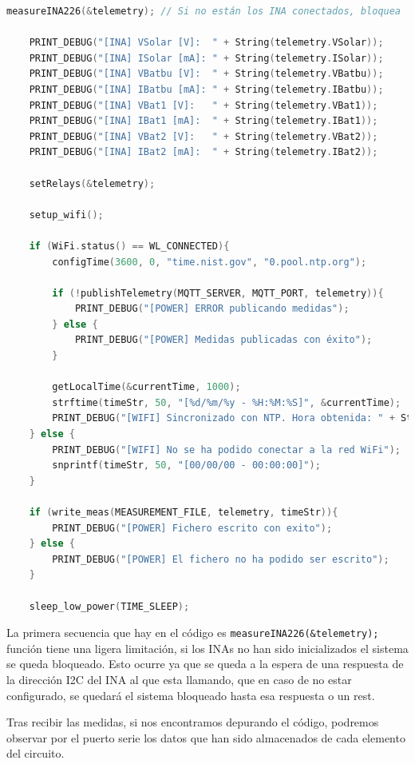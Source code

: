 \begin{lstlisting}[captionpos=b, caption={Codigo de la funcion loop}, language=c++]
    measureINA226(&telemetry); // Si no están los INA conectados, bloquea

    PRINT_DEBUG("[INA] VSolar [V]:  " + String(telemetry.VSolar));
    PRINT_DEBUG("[INA] ISolar [mA]: " + String(telemetry.ISolar));
    PRINT_DEBUG("[INA] VBatbu [V]:  " + String(telemetry.VBatbu));
    PRINT_DEBUG("[INA] IBatbu [mA]: " + String(telemetry.IBatbu));
    PRINT_DEBUG("[INA] VBat1 [V]:   " + String(telemetry.VBat1));
    PRINT_DEBUG("[INA] IBat1 [mA]:  " + String(telemetry.IBat1));
    PRINT_DEBUG("[INA] VBat2 [V]:   " + String(telemetry.VBat2));
    PRINT_DEBUG("[INA] IBat2 [mA]:  " + String(telemetry.IBat2));

    setRelays(&telemetry);

    setup_wifi();

    if (WiFi.status() == WL_CONNECTED){
        configTime(3600, 0, "time.nist.gov", "0.pool.ntp.org");
        
        if (!publishTelemetry(MQTT_SERVER, MQTT_PORT, telemetry)){
            PRINT_DEBUG("[POWER] ERROR publicando medidas");
        } else {
            PRINT_DEBUG("[POWER] Medidas publicadas con éxito");
        }

        getLocalTime(&currentTime, 1000);
        strftime(timeStr, 50, "[%d/%m/%y - %H:%M:%S]", &currentTime);
        PRINT_DEBUG("[WIFI] Sincronizado con NTP. Hora obtenida: " + String(timeStr));
    } else {
        PRINT_DEBUG("[WIFI] No se ha podido conectar a la red WiFi");
        snprintf(timeStr, 50, "[00/00/00 - 00:00:00]");
    }

    if (write_meas(MEASUREMENT_FILE, telemetry, timeStr)){
        PRINT_DEBUG("[POWER] Fichero escrito con exito");
    } else {
        PRINT_DEBUG("[POWER] El fichero no ha podido ser escrito");
    }

    sleep_low_power(TIME_SLEEP);
\end{lstlisting}

La primera secuencia que hay en el código es \texttt{measureINA226(&telemetry);} función tiene una ligera limitación, si los INAs no han sido inicializados el sistema se queda bloqueado.
Esto ocurre ya que se queda a la espera de una respuesta de la dirección I2C del INA al que esta llamando, que en caso de no estar configurado, se quedará el sistema bloqueado hasta esa respuesta o un rest.

Tras recibir las medidas, si nos encontramos depurando el código, podremos observar por el puerto serie los datos que han sido almacenados de cada elemento del circuito.

